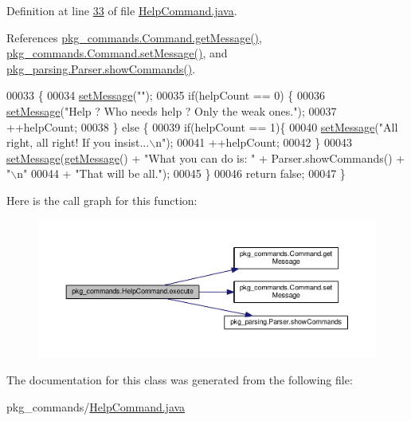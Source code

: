 Definition at line \hyperlink{HelpCommand_8java_source_l00033}{33} of file \hyperlink{HelpCommand_8java_source}{Help\-Command.\-java}.



References \hyperlink{Command_8java_source_l00097}{pkg\-\_\-commands.\-Command.\-get\-Message()}, \hyperlink{Command_8java_source_l00089}{pkg\-\_\-commands.\-Command.\-set\-Message()}, and \hyperlink{Parser_8java_source_l00059}{pkg\-\_\-parsing.\-Parser.\-show\-Commands()}.


\begin{DoxyCode}
00033                                           \{
00034         \hyperlink{classpkg__commands_1_1Command_ae210ff216fe908b111ba1c988a963d13}{setMessage}(\textcolor{stringliteral}{""});
00035         \textcolor{keywordflow}{if}(helpCount == 0) \{
00036             \hyperlink{classpkg__commands_1_1Command_ae210ff216fe908b111ba1c988a963d13}{setMessage}(\textcolor{stringliteral}{"Help ? Who needs help ? Only the weak ones."});
00037             ++helpCount;
00038         \} \textcolor{keywordflow}{else} \{
00039             \textcolor{keywordflow}{if}(helpCount == 1)\{
00040                 \hyperlink{classpkg__commands_1_1Command_ae210ff216fe908b111ba1c988a963d13}{setMessage}(\textcolor{stringliteral}{"All right, all right! If you insist...\(\backslash\)n"});
00041                 ++helpCount;
00042             \}
00043             \hyperlink{classpkg__commands_1_1Command_ae210ff216fe908b111ba1c988a963d13}{setMessage}(\hyperlink{classpkg__commands_1_1Command_ac2a42e2bab264821892daefaf9a18b6c}{getMessage}() + \textcolor{stringliteral}{"What you can do is: "} + Parser.showCommands() + \textcolor{stringliteral}{
      "\(\backslash\)n"}
00044                     + \textcolor{stringliteral}{"That will be all."});
00045         \}
00046         \textcolor{keywordflow}{return} \textcolor{keyword}{false};
00047     \}
\end{DoxyCode}


Here is the call graph for this function\-:
\nopagebreak
\begin{figure}[H]
\begin{center}
\leavevmode
\includegraphics[width=350pt]{classpkg__commands_1_1HelpCommand_a332d3e57539dfc82f8c539f8b3e24dd6_cgraph}
\end{center}
\end{figure}




The documentation for this class was generated from the following file\-:\begin{DoxyCompactItemize}
\item 
pkg\-\_\-commands/\hyperlink{HelpCommand_8java}{Help\-Command.\-java}\end{DoxyCompactItemize}
